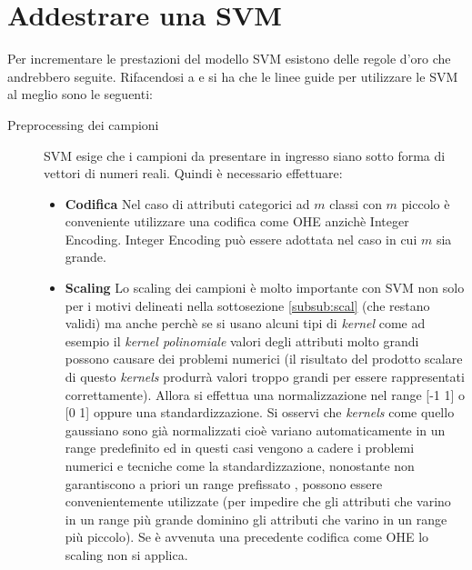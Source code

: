 \section{Addestrare una SVM}
Per incrementare le prestazioni del modello \ac{SVM} esistono delle regole d'oro che andrebbero seguite. Rifacendosi a \cite{SvmPracticalGuide10} e \cite{SvmAnotherPracticalGuide14} si ha che le linee guide per utilizzare le \ac{SVM} al meglio sono le seguenti:
\begin{description}
\item[Preprocessing dei campioni] \ac{SVM} esige che i campioni da presentare in ingresso siano sotto forma di vettori di numeri reali. Quindi è necessario effettuare:
\begin{itemize}
\item \textbf{Codifica} Nel caso di attributi categorici ad $m$ classi con $m$ piccolo è conveniente utilizzare una codifica come \ac{OHE} anzichè Integer Encoding. Integer Encoding può essere adottata nel caso in cui $m$ sia grande.
\item \textbf{Scaling} Lo scaling dei campioni è molto importante con \ac{SVM} non solo per i motivi delineati nella sottosezione \ref{subsub:scal} (che restano validi) ma anche perchè se si usano alcuni tipi di \textit{kernel}  come ad esempio il \textit{kernel polinomiale}  valori degli attributi molto grandi possono causare dei problemi numerici (il risultato del prodotto scalare di questo \textit{kernels} produrrà valori troppo grandi per essere rappresentati correttamente). Allora si effettua  una normalizzazione nel range [-1 1] o [0 1] oppure una standardizzazione. Si osservi che \textit{kernels} come quello gaussiano sono già normalizzati cioè variano automaticamente in un range predefinito ed in questi casi vengono a cadere i problemi numerici e tecniche come la standardizzazione, nonostante non garantiscono a priori un range prefissato , possono essere convenientemente utilizzate (per impedire che gli attributi che varino in un range più grande dominino gli attributi che varino in un range più piccolo). Se è avvenuta una precedente codifica come \ac{OHE} lo scaling non si applica.
\end{itemize}

\end{description}
